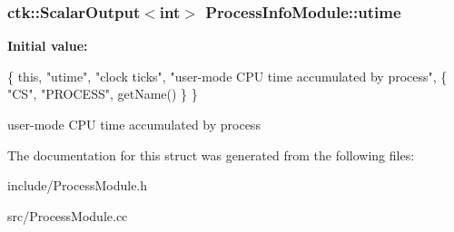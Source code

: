 \subsubsection[{\texorpdfstring{utime}{utime}}]{\setlength{\rightskip}{0pt plus 5cm}ctk\+::\+Scalar\+Output$<$int$>$ Process\+Info\+Module\+::utime}\hypertarget{structProcessInfoModule_acb97a86ba87cf1ac2d347b63a5f8fdfa}{}\label{structProcessInfoModule_acb97a86ba87cf1ac2d347b63a5f8fdfa}
{\bfseries Initial value\+:}
\begin{DoxyCode}
\{ \textcolor{keyword}{this}, \textcolor{stringliteral}{"utime"}, \textcolor{stringliteral}{"clock ticks"}, \textcolor{stringliteral}{"user-mode CPU time accumulated by process"},
    \{ \textcolor{stringliteral}{"CS"}, \textcolor{stringliteral}{"PROCESS"}, getName() \} \}
\end{DoxyCode}
user-\/mode C\+PU time accumulated by process 

The documentation for this struct was generated from the following files\+:\begin{DoxyCompactItemize}
\item 
include/Process\+Module.\+h\item 
src/Process\+Module.\+cc\end{DoxyCompactItemize}
